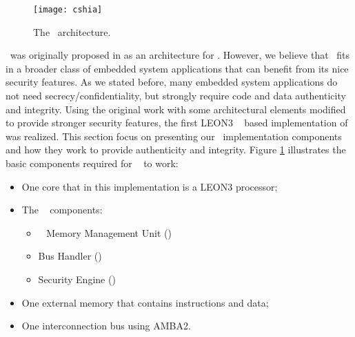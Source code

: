 

\begin{figure}[!ht]
	\centering
	\texttt{[image: cshia]}
	\caption{The \cshia~architecture.}
	\label{fig:cshia}
\end{figure}

\cshia~was originally proposed in \cite{Hoffman2015} as an architecture for \iot. However, we believe that \cshia~fits in a broader class of embedded system applications that can benefit from its nice security features. As we stated before, many embedded system applications do not need secrecy\slash{}confidentiality, but strongly require code and data authenticity and integrity. 
Using the original work with some architectural elements modified to provide stronger security features, the first LEON3 \fpga~ based implementation of \cshia was realized. This section focus on presenting our \cshia~implementation components and how they work to provide authenticity and integrity. Figure \ref{fig:cshia} illustrates the basic components required for \cshia~ to work: 
\begin{itemize}
    \item One core that in this implementation is a LEON3 processor;
    \item The \cshia~ components:
    \begin{itemize}
        \item \ptag~ Memory Management Unit (\pmmu)
        \item Bus Handler (\handler)
        \item Security Engine (\seceng) 
    \end{itemize}
    \item One external memory that contains instructions and data;
    \item One interconnection bus using AMBA2.
\end{itemize} 

